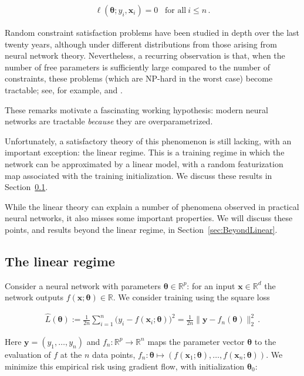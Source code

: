 \begin{align}
  \ell({\boldsymbol \theta};y_i,{\boldsymbol x}_i) = 0\;\;\; \text{for all}~ i\le n\, .
\end{align}

Random constraint satisfaction problems have been studied in depth over the last twenty years, although under different distributions from those arising from neural network theory. Nevertheless, a recurring observation is that, when the number of free parameters is sufficiently large compared to the number of constraints, these problems (which are NP-hard in the worst case) become tractable; see, for example, \cite{frieze1996analysis,achlioptas1997analysis} and \cite{coja2010better}.

These remarks motivate a fascinating working hypothesis: modern neural networks are tractable \emph{because} they are overparametrized.

Unfortunately, a satisfactory theory of this phenomenon is still lacking, with an important exception: the linear regime. This is a training regime in which the network can be approximated by a linear model, with a random featurization map associated with the training initialization. We discuss these results in Section~\ref{sec:LinearRegime}.

While the linear theory can explain a number of phenomena observed in practical neural networks, it also misses some important properties. We will discuss these points, and results beyond the linear regime, in Section~\ref{sec:BeyondLinear}.

\subsection{The linear regime}
\label{sec:LinearRegime}

Consider a neural network with parameters ${\boldsymbol \theta}\in{\mathbb R}^p$: for an input ${\boldsymbol x}\in{\mathbb R}^d$ the network outputs $f({\boldsymbol x};{\boldsymbol \theta})\in{\mathbb R}$. We consider training using the square loss

\begin{align}
  \widehat{L}({\boldsymbol \theta}) := \frac{1}{2n}\sum_{i=1}^n
  \big(y_i-f({\boldsymbol x}_i;{\boldsymbol \theta})\big)^2
  = \frac{1}{2n}\big\|{\boldsymbol y}-f_n({\boldsymbol \theta})\big\|_{2}^2\, .
\end{align}

Here ${\boldsymbol y}=(y_1,\ldots,y_n)$ and $f_n:{\mathbb R}^p\to{\mathbb R}^n$ maps the parameter vector ${\boldsymbol \theta}$ to the evaluation of $f$ at the $n$ data points, $f_n:{\boldsymbol \theta}\mapsto (f({\boldsymbol x}_1;{\boldsymbol \theta}),\dots,f({\boldsymbol x}_n;{\boldsymbol \theta}))$.
We minimize this empirical risk using gradient flow, with initialization ${\boldsymbol \theta}_0$:

